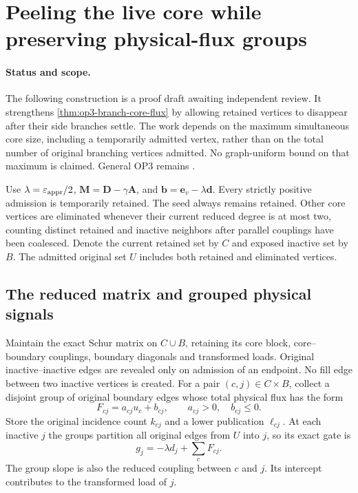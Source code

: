 \section{Peeling the live core while preserving physical-flux groups}
\label{sec:op3-live-core-peeling}

\paragraph{Status and scope.}
The following \statusproved{} construction is a proof draft awaiting
independent review. It strengthens \cref{thm:op3-branch-core-flux} by
allowing retained vertices to disappear after their side branches settle.
The work depends on the maximum simultaneous core size, including a
temporarily admitted vertex, rather than on the total number of original
branching vertices admitted. No graph-uniform bound on that maximum is
claimed. General OP3 remains \statusopen.

Use $\lambda=\varepsilon_{\mathrm{appr}}/2$, $\bm M=\bm D-\gamma\bm A$, and
$\bm b=\bm e_v-\lambda\bm d$. Every strictly positive admission is
temporarily retained. The seed always remains retained. Other core vertices
are eliminated whenever their current reduced degree is at most two,
counting distinct retained and inactive neighbors after parallel couplings
have been coalesced. Denote the current retained set by $C$ and exposed
inactive set by $B$. The admitted original set $U$ includes both retained
and eliminated vertices.

\subsection{The reduced matrix and grouped physical signals}

Maintain the exact Schur matrix on $C\cup B$, retaining its core block,
core--boundary couplings, boundary diagonals and transformed loads.
Original inactive--inactive edges are revealed only on admission of an
endpoint. No fill edge between two inactive vertices is created.
For a pair $(c,j)\in C\times B$, collect a disjoint group of original
boundary edges whose total physical flux has the form
\begin{equation}
 F_{cj}=a_{cj}u_c+b_{cj},\qquad
 a_{cj}>0,\quad b_{cj}\leq0.
 \label{eq:op3-grouped-physical-flux}
\end{equation}
Store the original incidence count $k_{cj}$ and a lower publication
$\ell_{cj}$. At each inactive $j$ the groups partition all original edges
from $U$ into $j$, so its exact gate is
\[
 g_j=-\lambda d_j+\sum_c F_{cj}.
\]
The group slope is also the reduced coupling between $c$ and $j$.
Its intercept contributes to the transformed load of $j$.

